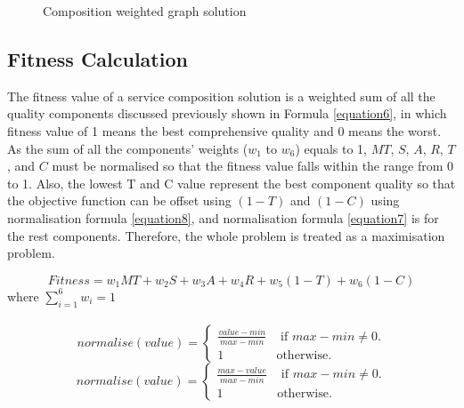 \documentclass{llncs}
\begin{document}
\begin{figure}[h]
\centerline{
}
 \caption{Composition weighted graph solution}
 \label{wscs}
\end{figure}

\subsection{Fitness Calculation}
The fitness value of a service composition solution is a weighted sum of all the quality components discussed previously shown in Formula \ref{equation6}, in which fitness value of 1 means the best comprehensive quality and 0 means the worst. As the sum of all the components' weights ($w_1$ to $w_6$) equals to 1, $MT$, $S$, $A$, $R$, $T$, and $C$ must be normalised so that the fitness value falls within the range from 0 to 1. Also, the lowest T and C value represent the best component quality so that the objective function can be offset using $(1 - T)$ and $(1 - C)$ using normalisation formula \ref{equation8}, and normalisation formula \ref{equation7} is for the rest components. Therefore, the whole problem is treated as a maximisation problem.

\begin{equation}
\label{equation6}
Fitness = w_1MT + w_2S + w_3A + w_4R + w_5(1 - T) + w_6(1 - C)
\end{equation}
\noindent where $\sum_{i=1}^{6} w_i = 1$
\\\\
\begin{equation}
\label{equation7}
normalise(value) = 
\begin{cases}
	\frac{value - min}{max - min} & \text{ if }max - min \neq 0.\\
	1 & \mathrm{ otherwise}.
\end{cases}
\end{equation}
\begin{equation}
\label{equation8}
normalise(value) = 
\begin{cases}
	\frac{max - value}{max - min} & \text{ if }max - min \neq 0.\\
	1 & \mathrm{ otherwise}.
\end{cases}
\end{equation}
\end{document}
